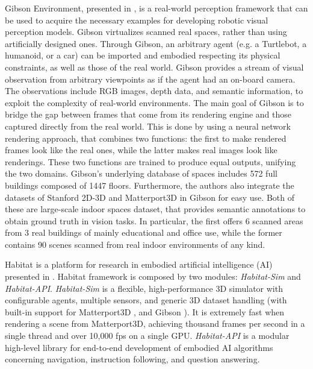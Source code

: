  Gibson Environment, presented in \cite{gibson}, is a real-world perception framework that can be used to acquire the necessary examples for developing robotic visual perception models. Gibson virtualizes scanned real spaces, rather than using artificially designed ones. Through Gibson, an arbitrary agent (e.g. a Turtlebot, a humanoid, or a car) can be imported and embodied respecting its physical constraints, as well as those of the real world. Gibson provides a stream of visual observation from arbitrary viewpoints as if the agent had an on-board camera. The observations include RGB images, depth data, and semantic information, to exploit the complexity of real-world environments. The main goal of Gibson is to bridge the gap between frames that come from its rendering engine and those captured directly from the real world. This is done by using a neural network rendering approach, that combines two functions: the first to make rendered frames look like the real ones, while the latter makes real images look like renderings. These two functions are trained to produce equal outputs, unifying the two domains. Gibson’s underlying database of spaces includes 572 full buildings composed of 1447 floors. Furthermore, the authors also integrate the datasets of Stanford 2D-3D \cite{stanford2d3d} and Matterport3D \cite{matterport} in Gibson for easy use. Both of these are large-scale indoor spaces dataset, that provides semantic annotations to obtain ground truth in vision tasks. In particular, the first offers 6 scanned areas from 3 real buildings of mainly educational and office use, while the former contains 90 scenes scanned from real indoor environments of any kind.
 
 Habitat is a platform for research in embodied artificial intelligence (AI) presented in \cite{habitat}. Habitat framework is composed by two modules: \textit{Habitat-Sim} and \textit{Habitat-API}. \textit{Habitat-Sim} is a flexible, high-performance 3D
 simulator with configurable agents, multiple sensors, and
 generic 3D dataset handling (with built-in support for Matterport3D \cite{matterport}, and Gibson \cite{gibson}). It is extremely fast when rendering a scene from Matterport3D, achieving thousand frames per second in a single thread and over 10,000 fps on a single GPU. \textit{Habitat-API} is a modular high-level library for end-to-end development of embodied AI algorithms concerning navigation, instruction following,
 and question answering.   
 
